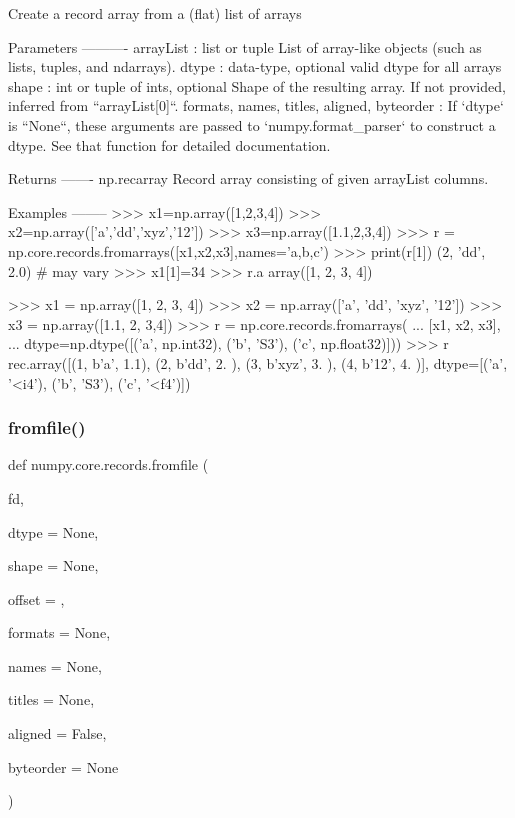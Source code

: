 \begin{DoxyVerb}Create a record array from a (flat) list of arrays

Parameters
----------
arrayList : list or tuple
    List of array-like objects (such as lists, tuples,
    and ndarrays).
dtype : data-type, optional
    valid dtype for all arrays
shape : int or tuple of ints, optional
    Shape of the resulting array. If not provided, inferred from
    ``arrayList[0]``.
formats, names, titles, aligned, byteorder :
    If `dtype` is ``None``, these arguments are passed to
    `numpy.format_parser` to construct a dtype. See that function for
    detailed documentation.

Returns
-------
np.recarray
    Record array consisting of given arrayList columns.

Examples
--------
>>> x1=np.array([1,2,3,4])
>>> x2=np.array(['a','dd','xyz','12'])
>>> x3=np.array([1.1,2,3,4])
>>> r = np.core.records.fromarrays([x1,x2,x3],names='a,b,c')
>>> print(r[1])
(2, 'dd', 2.0) # may vary
>>> x1[1]=34
>>> r.a
array([1, 2, 3, 4])

>>> x1 = np.array([1, 2, 3, 4])
>>> x2 = np.array(['a', 'dd', 'xyz', '12'])
>>> x3 = np.array([1.1, 2, 3,4])
>>> r = np.core.records.fromarrays(
...     [x1, x2, x3],
...     dtype=np.dtype([('a', np.int32), ('b', 'S3'), ('c', np.float32)]))
>>> r
rec.array([(1, b'a', 1.1), (2, b'dd', 2. ), (3, b'xyz', 3. ),
           (4, b'12', 4. )],
          dtype=[('a', '<i4'), ('b', 'S3'), ('c', '<f4')])
\end{DoxyVerb}
 \mbox{\label{namespacenumpy_1_1core_1_1records_ae8bc3a4297648b09a7b2b82af1c5d311}} 
\subsubsection{\texorpdfstring{fromfile()}{fromfile()}}
{\footnotesize\ttfamily def numpy.\+core.\+records.\+fromfile (\begin{DoxyParamCaption}\item[{}]{fd,  }\item[{}]{dtype = {\ttfamily None},  }\item[{}]{shape = {\ttfamily None},  }\item[{}]{offset = {},  }\item[{}]{formats = {\ttfamily None},  }\item[{}]{names = {\ttfamily None},  }\item[{}]{titles = {\ttfamily None},  }\item[{}]{aligned = {\ttfamily False},  }\item[{}]{byteorder = {\ttfamily None} }\end{DoxyParamCaption})}

